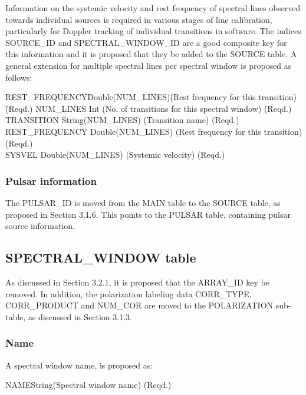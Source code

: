 \documentclass{article}
\begin{document}
\begin{itemize}
Information on the systemic velocity and rest frequency of spectral
lines observed towards individual sources is required in various
stages of line calibration, particularly for Doppler tracking of
individual transitions in software. The indices SOURCE\_ID and
SPECTRAL\_WINDOW\_ID are a good composite key for this information and
it is proposed that they be added to the SOURCE table. A general
extension for multiple spectral lines per spectral window is proposed
as follows:

\begin{tabbing}
REST\_FREQUENCY\quad\quad \= Double(NUM\_LINES)\quad\quad \=
(Rest frequency for this transition)\quad\quad\quad\quad\quad \= (Reqd.) \kill
NUM\_LINES \> Int \> 
(No. of transitions for this spectral window) \> (Reqd.) \\
TRANSITION           \> String(NUM\_LINES)  \> 
(Transition name) \> (Reqd.) \\
REST\_FREQUENCY       \> Double(NUM\_LINES) \>
(Rest frequency for this transition) \> (Reqd.) \\
SYSVEL               \> Double(NUM\_LINES) \>
(Systemic velocity) \> (Reqd.) \\
\end{tabbing}

\subsubsection{Pulsar information}

 The PULSAR\_ID is moved from the MAIN table to the SOURCE table, as
proposed in Section 3.1.6. This points to the PULSAR table, containing
pulsar source information.

\subsection{SPECTRAL\_WINDOW table}

As discussed in Section 3.2.1, it is proposed that the ARRAY\_ID key be
removed.  In addition, the polarization labeling data CORR\_TYPE,
CORR\_PRODUCT and NUM\_COR are moved to the POLARIZATION sub-table, as
discussed in Section 3.1.3.

\subsubsection{Name}

A spectral window name, is proposed as:

\begin{tabbing}
NAME\quad\quad \= String\quad\quad \= 
(Spectral window name) \quad\quad\quad \= (Reqd.) \\
\end{tabbing}



\end{itemize}
\end{document}
